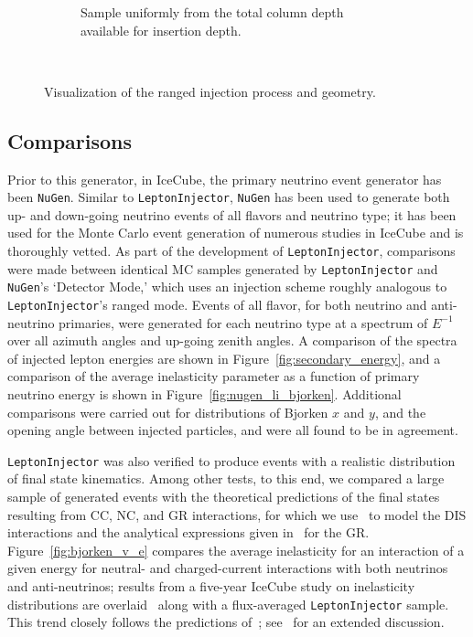 \documentclass[main.tex]{subfiles}
\newcommand{\LeptonInjector}{\texttt{LeptonInjector}}
\newcommand{\NuGen}{\texttt{NuGen}}
\begin{document}
\begin{figure}
\begin{subfigure}[b]{0.5\linewidth}
        \caption{Sample uniformly from the total column depth available for insertion depth. }
        \label{fig:lepton_ranged5}
    \end{subfigure} \\
    \caption{Visualization of the ranged injection process and geometry.}
    \label{fig:lepton_ranged}
\end{figure}

\subsection{Comparisons\label{sec:compare}}

Prior to this generator, in IceCube, the primary neutrino event generator has been \NuGen{}. 
Similar to \LeptonInjector{}, \NuGen{} has been used to generate both up- and down-going neutrino events of all flavors and neutrino type; it has been used for the Monte Carlo event generation of numerous studies in IceCube and is thoroughly vetted.  %
As part of the development of \LeptonInjector{}, comparisons were made between identical MC samples generated by \LeptonInjector{} and \NuGen{}'s `Detector Mode,' which uses an injection scheme roughly analogous to \LeptonInjector{}'s ranged mode. 
Events of all flavor, for both neutrino and anti-neutrino primaries, were generated for each neutrino type at a spectrum of $E^{-1}$ over all azimuth angles and up-going zenith angles.
A comparison of the spectra of injected lepton energies are shown in Figure~\ref{fig:secondary_energy}, and a comparison of the average inelasticity parameter as a function of primary neutrino energy is shown in Figure~\ref{fig:nugen_li_bjorken}. 
Additional comparisons were carried out for distributions of Bjorken $x$ and $y$, and the opening angle between injected particles, and were all found to be in agreement.

\LeptonInjector{} was also verified to produce events with a realistic distribution of final state kinematics.
Among other tests, to this end, we compared a large sample of generated events with the theoretical predictions of the final states resulting from CC, NC, and GR interactions, for which we use~\cite{CooperSarkar:2011pa} to model the DIS interactions and the analytical expressions given in~\cite{Glashow:1960zz,Gandhi:1995tf} for the GR.
Figure~\ref{fig:bjorken_v_e} compares the average inelasticity for an interaction of a given energy for neutral- and charged-current interactions with both neutrinos and anti-neutrinos; results from a five-year IceCube study on inelasticity distributions are overlaid~\cite{PhysRevD.99.032004} along with a flux-averaged \LeptonInjector{} sample.
This trend closely follows the predictions of~\cite{CooperSarkar:2011pa}; see~\cite{Binder:2017rlx} for an extended discussion.
\end{document}
